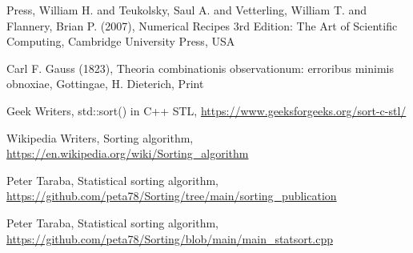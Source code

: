 \documentclass[12pt]{article}
\begin{document}
\begin{thebibliography}{9}
Press, William H. and Teukolsky, Saul A. and Vetterling, William T. and Flannery, Brian P. (2007), Numerical Recipes 3rd Edition: The Art of Scientific Computing, Cambridge University Press, USA

Carl F. Gauss (1823), Theoria combinationis observationum: erroribus minimis obnoxiae, Gottingae, H. Dieterich, Print

Geek Writers, std::sort() in C++ STL, \url{https://www.geeksforgeeks.org/sort-c-stl/}

Wikipedia Writers, Sorting algorithm, \url{https://en.wikipedia.org/wiki/Sorting_algorithm}

Peter Taraba, Statistical sorting algorithm, \url{https://github.com/peta78/Sorting/tree/main/sorting_publication}

Peter Taraba, Statistical sorting algorithm, \url{https://github.com/peta78/Sorting/blob/main/main_statsort.cpp}

\end{thebibliography}

	
	
\end{document}
